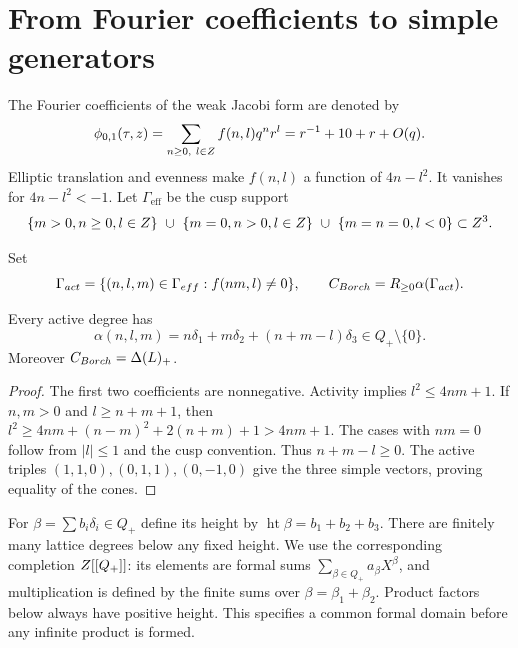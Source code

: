\section{From Fourier coefficients to simple generators}
\label{sec:bkm-roots}
\label{sec:bkm-active-support}

The Fourier coefficients of the weak Jacobi form are denoted by
\begin{equation}
\label{eq:bkm-phi01-expansion}
 \phi_{0,1}(\tau,z)=\sum_{n\geq0,\ l\in Z}f(n,l)q^nr^l
 =r^{-1}+10+r+O(q).
\end{equation}
Elliptic translation and evenness make $f(n,l)$ a function of
$4n-l^2$. It vanishes for $4n-l^2<-1$. Let $\Gamma_{\mathrm{eff}}$
be the cusp support
\[
 \{m>0,n\geq0,l\in Z\}\ \cup\
 \{m=0,n>0,l\in Z\}\ \cup\
 \{m=n=0,l<0\}\subset Z^3.
\]

\begin{definition}
\label{def:bkm-active-support}
Set
\[
 \Gamma_{act}=\{(n,l,m)\in\Gamma_{eff}:f(nm,l)\ne0\},
 \qquad C_{Borch}=R_{\geq0}\alpha(\Gamma_{act}).
\]
\end{definition}

\begin{lemma}
\label{lem:bkm-active-cone}
Every active degree has
\begin{equation}
\label{eq:bkm-active-decomposition}
 \alpha(n,l,m)=n\delta_1+m\delta_2+(n+m-l)\delta_3\in Q_+\setminus\{0\}.
\end{equation}
Moreover $C_{Borch}=\Delta(L)_+$.
\end{lemma}
\begin{proof}
The first two coefficients are nonnegative. Activity implies
$l^2\leq4nm+1$. If $n,m>0$ and $l\geq n+m+1$, then
$l^2\geq4nm+(n-m)^2+2(n+m)+1>4nm+1$. The cases with $nm=0$
follow from $|l|\leq1$ and the cusp convention. Thus $n+m-l\geq0$.
The active triples $(1,1,0),(0,1,1),(0,-1,0)$ give the three
simple vectors, proving equality of the cones.
\end{proof}

For $\beta=\sum b_i\delta_i\in Q_+$ define its height by
$\operatorname{ht}\beta=b_1+b_2+b_3$. There are finitely many
lattice degrees below any fixed height. We use the corresponding
completion $Z[[Q_+]]$: its elements are formal sums
$\sum_{\beta\in Q_+}a_\beta X^\beta$, and multiplication is defined
by the finite sums over $\beta=\beta_1+\beta_2$. Product factors
below always have positive height. This specifies a common formal
domain before any infinite product is formed.

